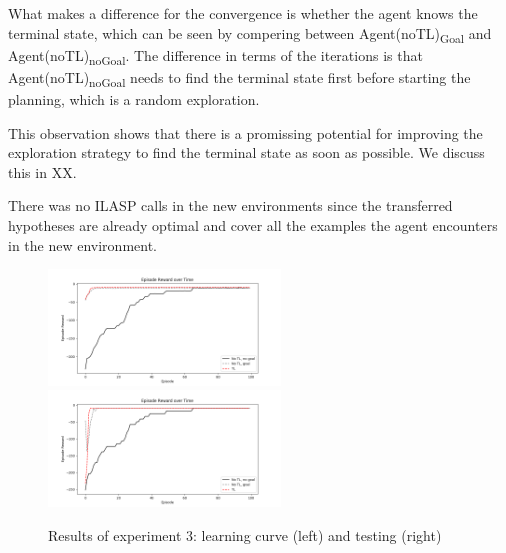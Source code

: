 What makes a difference for the convergence is whether the agent knows the terminal state, which can be seen by compering between Agent(noTL)\textsubscript{Goal} and Agent(noTL)\textsubscript{noGoal}.
The difference in terms of the iterations is that Agent(noTL)\textsubscript{noGoal} needs to find the terminal state first before starting the planning, which is a random exploration.

This observation shows that there is a promissing potential for improving the exploration strategy to find the terminal state as soon as possible.
We discuss this in XX.

There was no ILASP calls in the new environments since the transferred hypotheses are already optimal and cover all the examples the agent encounters in the new environment.

\begin{figure}[!htb]
\centerline{
\includegraphics[width=0.55\textwidth]{./figures/experiment3_after_training}
\includegraphics[width=0.55\textwidth]{./figures/experiment3_after_test}
}
\caption{Results of experiment 3: learning curve (left) and testing (right)}
\label{experiment3_training}
\end{figure}


